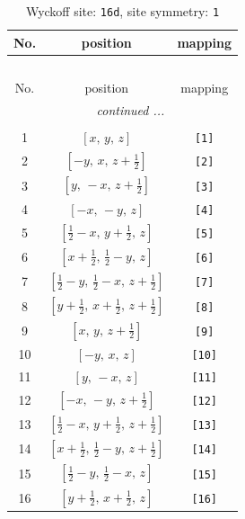 \documentclass[fleqn,8pt]{jsarticle}
\begin{document}
\begin{longtable}{ccc}
\caption{Wyckoff site: {\tt 16d}, site symmetry: {\tt 1}}
 \\
 \hline \hline
No. & position & mapping \\ \hline \endfirsthead

\multicolumn{2}{l}{\tablename\ \thetable{}} \\
 \hline \hline
No. & position & mapping \\ \hline \endhead

 \hline \hline
\multicolumn{2}{r}{\footnotesize\it continued ...} \\ \endfoot

 \hline \hline
\multicolumn{2}{r}{} \\ \endlastfoot

1 & $\left[ x,\, y,\, z \right]$ & {\tt [1]} \\ \hline
2 & $\left[ - y,\, x,\, z + \frac{1}{2} \right]$ & {\tt [2]} \\ \hline
3 & $\left[ y,\, - x,\, z + \frac{1}{2} \right]$ & {\tt [3]} \\ \hline
4 & $\left[ - x,\, - y,\, z \right]$ & {\tt [4]} \\ \hline
5 & $\left[ \frac{1}{2} - x,\, y + \frac{1}{2},\, z \right]$ & {\tt [5]} \\ \hline
6 & $\left[ x + \frac{1}{2},\, \frac{1}{2} - y,\, z \right]$ & {\tt [6]} \\ \hline
7 & $\left[ \frac{1}{2} - y,\, \frac{1}{2} - x,\, z + \frac{1}{2} \right]$ & {\tt [7]} \\ \hline
8 & $\left[ y + \frac{1}{2},\, x + \frac{1}{2},\, z + \frac{1}{2} \right]$ & {\tt [8]} \\ \hline
9 & $\left[ x,\, y,\, z + \frac{1}{2} \right]$ & {\tt [9]} \\ \hline
10 & $\left[ - y,\, x,\, z \right]$ & {\tt [10]} \\ \hline
11 & $\left[ y,\, - x,\, z \right]$ & {\tt [11]} \\ \hline
12 & $\left[ - x,\, - y,\, z + \frac{1}{2} \right]$ & {\tt [12]} \\ \hline
13 & $\left[ \frac{1}{2} - x,\, y + \frac{1}{2},\, z + \frac{1}{2} \right]$ & {\tt [13]} \\ \hline
14 & $\left[ x + \frac{1}{2},\, \frac{1}{2} - y,\, z + \frac{1}{2} \right]$ & {\tt [14]} \\ \hline
15 & $\left[ \frac{1}{2} - y,\, \frac{1}{2} - x,\, z \right]$ & {\tt [15]} \\ \hline
16 & $\left[ y + \frac{1}{2},\, x + \frac{1}{2},\, z \right]$ & {\tt [16]} \\
\end{longtable}
\end{document}
